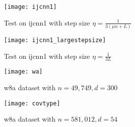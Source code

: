  \begin{figure}
\center
\texttt{[image: ijcnn1]} 
\caption{Test on ijcnn1 with step size $\eta = \frac{1}{3(\mu n + L)}$}
\label{fig:ijcnn1}
\end{figure}
\begin{figure}
\center
\texttt{[image: ijcnn1\_largestepsize]} 
\caption{Test on ijcnn1 with step size $\eta = \frac{1}{3L}$}
\label{fig:ijcnn1_large}
\end{figure}
\begin{figure}
\center
\texttt{[image: wa]} 
\caption{w8a dataset with $n = 49,749, d = 300$}
\label{fig:wa}
\end{figure}
\begin{figure}
\center
\texttt{[image: covtype]} 
\caption{w8a dataset with $n = 581,012, d = 54$}
\label{fig:covtype}
\end{figure}


